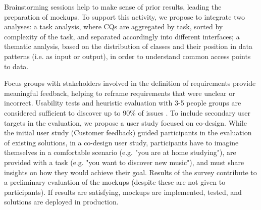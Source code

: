 \documentclass[manuscript]
{acmart}
\begin{document}
Brainstorming sessions help to make sense of prior results, leading the preparation of mockups. To support this activity, we propose to integrate two analyses: a task analysis, where CQs are aggregated by task, sorted by complexity of the task, and separated accordingly into different interfaces; a thematic analysis, based on the distribution of classes and their position in data patterns (i.e. as input or output), in order to understand common access points to data.

Focus groups with stakeholders involved in the definition of requirements provide meaningful feedback, helping to reframe requirements that were unclear or incorrect. Usability tests and heuristic evaluation with 3-5 people groups are considered sufficient to discover up to 90\% of issues \cite{nielsen1994guerrilla}. To include secondary user targets in the evaluation, we propose a user study focused on co-design. While the initial user study (Customer feedback) guided participants in the evaluation of existing solutions, in a co-design user study, participants have to imagine themselves in a comfortable scenario (e.g. "you are at home studying"), are provided with a task (e.g. "you want to discover new music"), and must share insights on how they would achieve their goal. Results of the survey contribute to a preliminary evaluation of the mockups (despite these are not given to participants). If results are satisfying, mockups are implemented, tested, and solutions are deployed in production.
\end{document}
